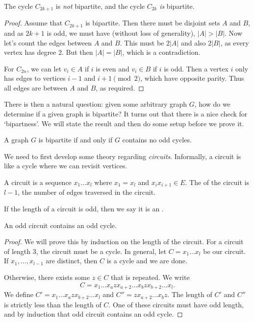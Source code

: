 \documentclass[a4paper]{scrreprt}
\begin{document}
\begin{proposition}
	The cycle $C_{2k + 1}$ is \emph{not} bipartite, and the cycle $C_{2k}$ \emph{is} bipartite.
\end{proposition}
\begin{proof}
	Assume that $C_{2k + 1}$ is bipartite. Then there must be disjoint sets $A$ and $B$, and as $2k + 1$ is odd, we must have (without loss of generality), $|A| > |B|$. Now let's count the edges between $A$ and $B$. This must be $2|A|$ and also $2|B|$, as every vertex has degree 2. But then $|A| = |B|$, which is a contradiction.

	For $C_{2n}$, we can let $v_i \in A$ if $i$ is even and $v_i \in B$ if $i$ is odd. Then a vertex $i$ only has edges to vertices $i - 1$ and $i + 1 \pmod{2}$, which have opposite parity. Thus all edges are between $A$ and $B$, as required.
\end{proof}

There is then a natural question: given some arbitrary graph $G$, how do we determine if a given graph is bipartite? It turns out that there is a nice check for `bipartness'. We will state the result and then do some setup before we prove it. 

\begin{proposition}
	A graph $G$ is bipartite if and only if $G$ contains no odd cycles.
\end{proposition}

We need to first develop some theory regarding \emph{circuits}.
Informally, a circuit is like a cycle where we can revisit vertices.


\begin{definition}[Circuit]
A circuit is a sequence $x_1 \dots x_l$ where $x_1 = x_l$ and $x_i x_{i + 1} \in E$. The  of the circuit is $l - 1$, the number of edges traversed in the circuit.
\end{definition}

\begin{definition}
	If the length of a circuit is odd, then we say it is an .
\end{definition}

\begin{proposition}
An odd circuit contains an odd cycle.	
\end{proposition}
\begin{proof}
	We will prove this by induction on the length of the circuit. For a circuit of length $3$, the circuit must be a cycle.
	In general, let $C = x_1 \dots x_l$ be our circuit. If $x_1, \dots, x_{l - 1}$ are distinct, then $C$ is a cycle and we are done. 
	
	Otherwise, there exists some $z \in C$ that is repeated. We write 
	$$C = x_1 \dots x_a z x_{a + 2} \dots x_{b} z x_{b + 2} \dots x_l.$$
	We define $C' = x_1 \dots x_a z x_{b + 2} \dots x_l$ and $C'' = z x_{a + 2} \dots x_b z$. The length of $C'$ and $C''$ is strictly less than the length of $C$. One of these circuits must have odd length, and by induction that odd circuit contains an odd cycle.
\end{proof}
\end{document}

